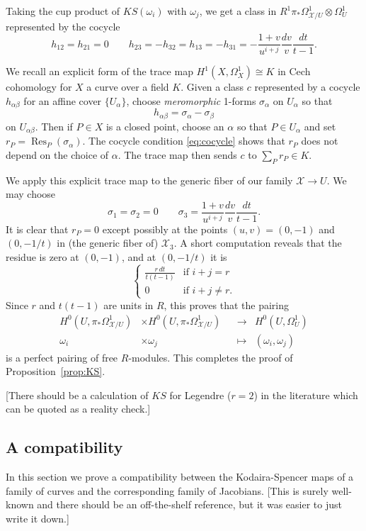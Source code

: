 \documentclass[reqno]{amsart}
\theoremstyle{definition}
\theoremstyle{remark}
\def\XX{\mathcal{X}}
\def\tensor{\otimes}
\DeclareMathOperator{\res}{Res}
\begin{document}
Taking the cup product of $KS(\omega_i)$ with $\omega_j$, we get a
class in $R^1\pi_*\Omega^1_{\XX/U}\tensor\Omega^1_U$ represented by
the cocycle
$$h_{12}=h_{21}=0\qquad h_{23}=-h_{32}=h_{13}=-h_{31}=
-\frac{1+v}{u^{i+j}}\frac{dv}{v}\frac{dt}{t-1}.$$

We recall an explicit form of the trace map
$H^1(X,\Omega^1_X)\cong K$ in Cech cohomology for $X$ a curve over a
field $K$. 
Given a class $c$ represented by a cocycle $h_{\alpha\beta}$
for an affine cover $\{U_\alpha\}$,
choose {\it meromorphic\/} 1-forms $\sigma_\alpha$ on $U_\alpha$ so that
\begin{equation}\label{eq:cocycle}
h_{\alpha\beta}=\sigma_\alpha-\sigma_\beta
\end{equation}
on $U_{\alpha\beta}$. Then if $P\in X$ is a closed point, choose an
$\alpha$ so that $P\in U_\alpha$ and set $r_P=\res_P(\sigma_\alpha)$.
The cocycle condition \eqref{eq:cocycle} shows that $r_P$ does not
depend on the choice of $\alpha$. The trace map then sends $c$ to
$\sum_Pr_P\in K$.

We apply this explicit trace map to the generic fiber of our
family $\XX\to U$. We may choose
$$\sigma_1=\sigma_2=0\qquad\sigma_3=
\frac{1+v}{u^{i+j}}\frac{dv}{v}\frac{dt}{t-1}.$$ It is clear that
$r_P=0$ except possibly at the points $(u,v)=(0,-1)$ and $(0,-1/t)$ in
(the generic fiber of) $\XX_3$. A short computation reveals that the
residue is zero at $(0,-1)$, and at $(0,-1/t)$ it is
$$\begin{cases}
\frac{r\,dt}{t(t-1)}&\text{if $i+j=r$}\\
0&\text{if $i+j\neq r$.}
\end{cases}
$$
Since $r$ and $t(t-1)$ are units in $R$, this proves that the pairing 
\begin{align*}
H^0(U,\pi_*\Omega^1_{\XX/U})&\times H^0(U,\pi_*\Omega^1_{\XX/U})&&\to
&H^0(U,\Omega^1_U)\\
\omega_i&\times\omega_j&&\mapsto&(\omega_i,\omega_j)\quad
\end{align*}
is a perfect pairing of free $R$-modules.  This completes the proof of
Proposition~\ref{prop:KS}.

[There should be a calculation of $KS$ for Legendre ($r=2$) in the
literature which can be quoted as a reality check.]

\subsection{A compatibility}
In this section we prove a compatibility between the Kodaira-Spencer
maps of a family of curves and the corresponding family of Jacobians.
[This is surely well-known and there should be an off-the-shelf reference,
but it was easier to just write it down.]
\end{document}
